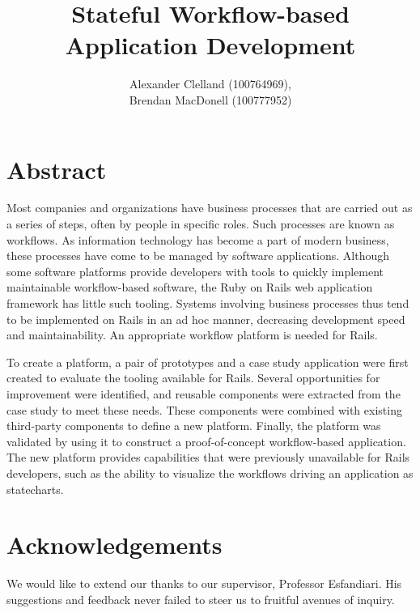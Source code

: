 \documentclass[document.tex]{subfiles}
\begin{document}
\title{Stateful Workflow-based\\Application Development}
\author{
  Alexander Clelland (100764969), \\
  Brendan MacDonell (100777952)
}
\copyrightfalse %

\beforepreface

\chapter*{Abstract}
Most companies and organizations have business processes that are carried out as a series of steps, often by people in specific roles. Such processes are known as workflows. As information technology has become a part of modern business, these processes have come to be managed by software applications. Although some software platforms provide developers with tools to quickly implement maintainable workflow-based software, the Ruby on Rails web application framework has little such tooling. Systems involving business processes thus tend to be implemented on Rails in an ad hoc manner, decreasing development speed and maintainability. An appropriate workflow platform is needed for Rails.

To create a platform, a pair of prototypes and a case study application were first created to evaluate the tooling available for Rails. Several opportunities for improvement were identified, and reusable components were extracted from the case study to meet these needs. These components were combined with existing third-party components to define a new platform. Finally, the platform was validated by using it to construct a proof-of-concept workflow-based application. The new platform provides capabilities that were previously unavailable for Rails developers, such as the ability to visualize the workflows driving an application as statecharts.


\chapter*{Acknowledgements}

We would like to extend our thanks to our supervisor, Professor Esfandiari.
His suggestions and feedback never failed to steer us to fruitful avenues of inquiry.
\end{document}
